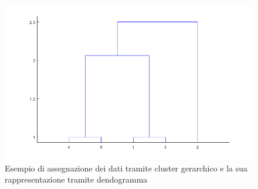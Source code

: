 \begin{figure}[h!]
	\centering
	\includegraphics[width=1\textwidth]{images/example_dendogram.png}
	\caption{Esempio di assegnazione dei dati tramite cluster gerarchico e la sua rappresentazione tramite dendogramma}
\end{figure}
